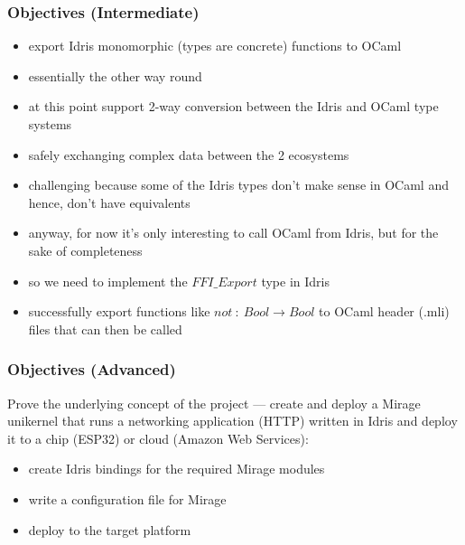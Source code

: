 \documentclass{beamer}
\begin{document}
\begin{frame}
	\frametitle{Objectives (Intermediate)}

	\begin{itemize}
		\item export Idris monomorphic (types are concrete) functions
		      to OCaml
		\item essentially the other way round
		\item at this point support 2-way conversion between
		      the Idris and OCaml type systems
		\item safely exchanging complex data between the 2 ecosystems
		\item challenging because some of the Idris types don't make
		      sense in OCaml and hence, don't have equivalents
		\item anyway, for now it's only interesting to call OCaml
		      from Idris, but for the sake of completeness
		\item so we need to implement the $FFI\_Export$ type in Idris
		\item successfully export functions like
		      $not \ : \ Bool \rightarrow Bool$ to OCaml header (.mli)
		      files that can then be called
	\end{itemize}
\end{frame}


\begin{frame}
	\frametitle{Objectives (Advanced)}

	Prove the underlying concept of the project — create and deploy a Mirage unikernel that runs a networking
	application (HTTP) written in Idris and deploy it to a chip (ESP32) or cloud (Amazon Web Services):

	\begin{itemize}
		\item create Idris bindings for the required Mirage modules
		\item write a configuration file for Mirage
		\item deploy to the target platform
	\end{itemize}
\end{frame}
\end{document}
